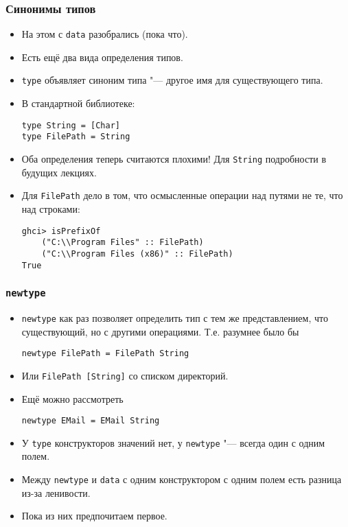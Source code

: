 \documentclass[10pt]{beamer}
\begin{document}
\begin{frame}[fragile]
\frametitle{Синонимы типов}
\begin{itemize}
    \item На этом с \lstinline|data| разобрались (пока что).
    \pause
    \item Есть ещё два вида определения типов.
    \item \lstinline|type| объявляет синоним типа "--- другое имя для существующего типа. 
    \item В стандартной библиотеке:
\begin{lstlisting}
type String = [Char]
type FilePath = String
\end{lstlisting}
    \item Оба определения теперь считаются плохими! Для \lstinline|String| подробности в будущих лекциях.
    \pause 
    \item Для \lstinline|FilePath| дело в том, что осмысленные операции над путями не те, что над строками:
\begin{lstlisting}
ghci> isPrefixOf 
    ("C:\\Program Files" :: FilePath) 
    ("C:\\Program Files (x86)" :: FilePath)
True
\end{lstlisting}
\end{itemize}
\end{frame}

\begin{frame}[fragile]
\frametitle{\lstinline|newtype|}
\begin{itemize}
    \item \lstinline|newtype| как раз позволяет определить тип с тем же представлением, что существующий, но с другими операциями. Т.е. разумнее было бы 
\begin{lstlisting}
newtype FilePath = FilePath String
\end{lstlisting}
    \item Или \lstinline|FilePath [String]| со списком директорий.
    \item Ещё можно рассмотреть
\begin{lstlisting}
newtype EMail = EMail String
\end{lstlisting}
    \item У \lstinline|type| конструкторов значений нет, у \lstinline|newtype| "--- всегда один с одним полем.
    \item Между \lstinline|newtype| и \lstinline|data| с одним конструктором с одним полем есть разница из-за ленивости.
    \item Пока из них предпочитаем первое.
\end{itemize}
\end{frame}
\end{document}
